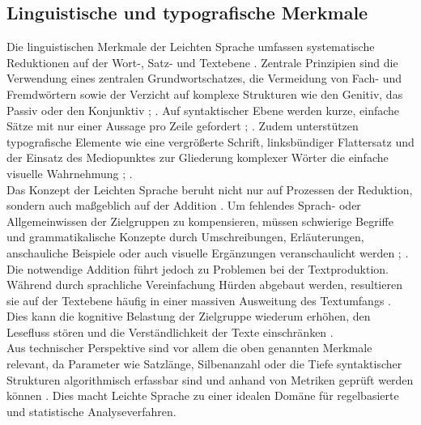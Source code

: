 \subsection{Linguistische und typografische Merkmale}
Die linguistischen Merkmale der Leichten Sprache umfassen systematische Reduktionen auf der Wort-, Satz- und Textebene \cite{DINSPEC334292019}. 
Zentrale Prinzipien sind die Verwendung eines zentralen Grundwortschatzes, die Vermeidung von Fach- und Fremdwörtern sowie der Verzicht auf komplexe Strukturen wie den Genitiv, das Passiv oder den Konjunktiv \cite{DINSPEC334292019}; \cite{NetzwerkLeichteSprache2022}.
Auf syntaktischer Ebene werden kurze, einfache Sätze mit nur einer Aussage pro Zeile gefordert \cite[S. 29-40]{NetzwerkLeichteSprache2022}; \cite{DINSPEC334292019}.
Zudem unterstützen typografische Elemente wie eine vergrößerte Schrift, linksbündiger Flattersatz und der Einsatz des Mediopunktes zur Gliederung komplexer Wörter die einfache visuelle Wahrnehmung \cite{DINSPEC334292019}; \cite{NetzwerkLeichteSprache2022}.\\
Das Konzept der Leichten Sprache beruht nicht nur auf Prozessen der Reduktion, sondern auch maßgeblich auf der Addition \cite[S. 295]{maas_handbuch_2018}.
Um fehlendes Sprach- oder Allgemeinwissen der Zielgruppen zu kompensieren, müssen schwierige Begriffe und grammatikalische Konzepte durch Umschreibungen, Erläuterungen, anschauliche Beispiele oder auch visuelle Ergänzungen veranschaulicht werden \cite{DINSPEC334292019}; \cite{NetzwerkLeichteSprache2022}.
Die notwendige Addition führt jedoch zu Problemen bei der Textproduktion. Während durch sprachliche Vereinfachung Hürden abgebaut werden, resultieren sie auf der Textebene häufig in einer massiven Ausweitung des Textumfangs \cite[S. 295]{maas_handbuch_2018}.
Dies kann die kognitive Belastung der Zielgruppe wiederum erhöhen, den Lesefluss stören und die Verständlichkeit der Texte einschränken \cite[S. 26-27]{DINSPEC334292019}.\\
Aus technischer Perspektive sind vor allem die oben genannten Merkmale relevant, da Parameter wie Satzlänge, Silbenanzahl oder die Tiefe syntaktischer Strukturen algorithmisch erfassbar sind und anhand von Metriken geprüft werden können \cite[S. 153-154, 440-441]{maas_handbuch_2018}.
Dies macht Leichte Sprache zu einer idealen Domäne für regelbasierte und statistische Analyseverfahren.

